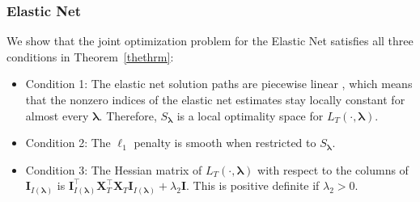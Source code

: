 \documentclass[12pt,letterpaper]{article}
\begin{document}
\subsubsection{Elastic Net}\label{enet_conditions}
We show that the joint optimization problem for the Elastic Net satisfies all three conditions in Theorem~\ref{thethrm}:
\begin{itemize}
\item[] Condition 1: The elastic net solution paths are piecewise linear \citep{zou2003regression, tibshirani2013lasso}, which means that the nonzero indices of the elastic net estimates stay locally constant for almost every $\boldsymbol{\lambda}$. Therefore, $S_{\boldsymbol{\lambda}}$ is a local optimality space for $L_T(\cdot, \boldsymbol{\lambda})$. \hfill {}
\item[] Condition 2: The $\ell_1$ penalty is smooth when restricted to $S_{\boldsymbol{\lambda}}$.\hfill {}
\item[] Condition 3: The Hessian matrix of $L_T(\cdot, \boldsymbol{\lambda})$ with respect to the columns of $\boldsymbol I_{I(\boldsymbol \lambda)}$ is $\boldsymbol I_{I(\boldsymbol \lambda)}^\top \boldsymbol{X}_{T}^\top \boldsymbol{X}_{T} \boldsymbol I_{I(\boldsymbol \lambda)} + \lambda_2 \boldsymbol{I}$. This is positive definite if $\lambda_2 > 0$. \hfill {}
\end{itemize}
\end{document}
